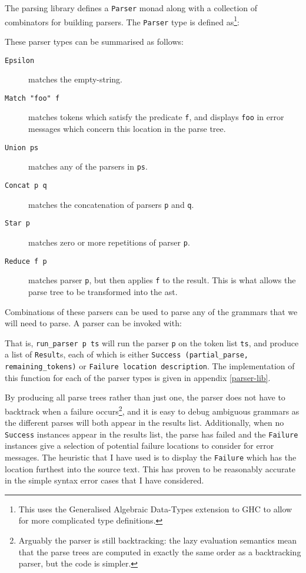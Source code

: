 The parsing library defines a \texttt{Parser} monad along with a collection of
combinators for building parsers. The \texttt{Parser} type is defined
as\footnote{This uses the Generalised Algebraic Data-Types extension to GHC to
allow for more complicated type definitions.}:

These parser types can be summarised as follows:
\begin{description}
  \item[\texttt{Epsilon}] matches the empty-string.
  \item[\texttt{Match "foo" f}] matches tokens which satisfy the predicate \texttt{f},
    and displays \texttt{foo} in error messages which concern this location in
    the parse tree.
  \item[\texttt{Union ps}] matches any of the parsers in \texttt{ps}.
  \item[\texttt{Concat p q}] matches the concatenation of parsers \texttt{p} and
    \texttt{q}.
  \item[\texttt{Star p}] matches zero or more repetitions of parser \texttt{p}.
  \item[\texttt{Reduce f p}] matches parser \texttt{p}, but then applies
    \texttt{f} to the result. This is what allows the parse tree to be
    transformed into the \gls{ast}.
\end{description}
Combinations of these parsers can be used to parse any of the grammars that we
will need to parse. A parser can be invoked with:

That is, \texttt{run\_parser p ts} will run the parser \texttt{p} on the token
list \texttt{ts}, and produce a list of \texttt{Result}s, each of which is
either \texttt{Success (partial\_parse, remaining\_tokens)} or
\texttt{Failure location description}. The implementation of this function for
each of the parser types is given in appendix \ref{parser-lib}.

By producing all parse trees rather than just one, the parser does not have to
backtrack when a failure occurs\footnote{Arguably the parser is still
backtracking: the lazy evaluation semantics mean that the parse trees are
computed in exactly the same order as a backtracking parser, but the code is
simpler.}, and it is easy to debug ambiguous grammars as the different parses
will both appear in the results list. Additionally, when no \texttt{Success}
instances appear in the results list, the parse has failed and the
\texttt{Failure} instances give a selection of potential failure locations to
consider for error messages. The heuristic that I have used is to display the
\texttt{Failure} which has the location furthest into the source text. This has
proven to be reasonably accurate in the simple syntax error cases that I have
considered.

